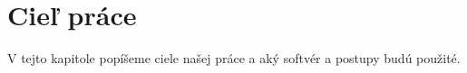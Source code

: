 \chapter{Cieľ práce}
V tejto kapitole popíšeme ciele našej práce a aký softvér a postupy budú použité.
\label{kap:ciel} %

 

